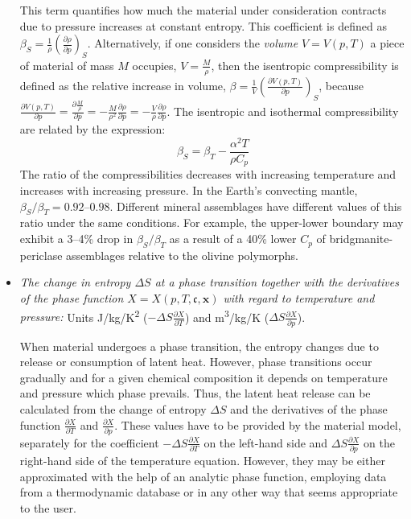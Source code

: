\documentclass{article}
\begin{document}
\begin{itemize}
  This term quantifies how much the material under consideration
  contracts due to pressure increases at constant entropy.
  This coefficient is defined as
  $\beta_S = \frac{1}{\rho} \left( \frac{\partial \rho}{\partial p} \right)_{S}$.
  Alternatively, if
  one considers the \textit{volume} $V=V(p, T)$ a piece of material of mass $M$
  occupies, $V=\frac{M}{\rho}$, then the isentropic compressibility
  is defined as the relative increase in volume,
  $\beta=\frac{1}{V}\left(\frac{\partial V(p, T)}{\partial p}\right)_{S}$, because
  $\frac{\partial V(p, T)}{\partial p} =
   \frac{\partial \frac{M}{\rho}}{\partial p} =
   -\frac{M}{\rho^2} \frac{\partial \rho}{\partial p} =
   -\frac{V}{\rho} \frac{\partial \rho}{\partial p}$.
   The isentropic and isothermal compressibility are related by the expression:
   \begin{equation}
     \beta_S = \beta_T - \frac{\alpha^2 T}{\rho C_p}
   \end{equation}
   The ratio of the compressibilities decreases with increasing temperature
   and increases with increasing pressure. In the Earth's convecting mantle,
   $\beta_S/\beta_T = 0.92$--$0.98$. Different mineral assemblages have
   different values of this ratio under the same conditions. For example, the
   upper-lower boundary may exhibit a 3--4\% drop in $\beta_S / \beta_T$
   as a result of a 40\% lower $C_p$ of bridgmanite-periclase assemblages
   relative to the olivine polymorphs.


\item \textit{The change in entropy $\Delta S$ at a
  phase transition together with the derivatives of the phase function
  $X=X(p,T,\mathfrak c,\mathbf x)$ with regard to temperature and pressure:} Units
  \si{J/kg/K^2} ($-\Delta S \frac{\partial X}{\partial T}$) and
  \si{m^3/kg/K} ($\Delta S \frac{\partial X}{\partial p}$).

  When material undergoes a phase transition, the entropy changes due to
  release or consumption of latent heat. However, phase transitions occur
  gradually and for a given chemical composition it depends on temperature
  and pressure which phase prevails. Thus, the latent heat release can
  be calculated from the change of entropy $\Delta S$ and the derivatives
  of the phase function $\frac{\partial X}{\partial T}$ and
  $\frac{\partial X}{\partial p}$. These values have to be provided by
  the material model, separately for the coefficient
  $-\Delta S \frac{\partial X}{\partial T}$ on the left-hand side and
  $\Delta S \frac{\partial X}{\partial p}$ on the right-hand side of the
  temperature equation. However, they may be either approximated with the help
  of an analytic phase function, employing data from a thermodynamic database
  or in any other way that seems appropriate to the user.
\end{itemize}
\end{document}
